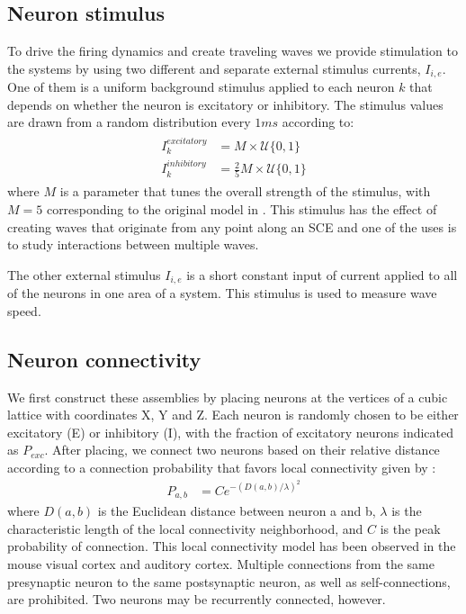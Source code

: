 \documentclass[12pt]{article}
\begin{document}
\subsection{Neuron stimulus}
To drive the firing dynamics and create traveling waves we provide stimulation to the systems by using two different and separate external stimulus currents, $I_{i,e}$. 
One of them is a uniform background stimulus applied to each neuron $k$ that depends on whether the neuron is excitatory or inhibitory.
The stimulus values are drawn from a random distribution every $1 ms$ according to:
\begin{align}\label{eq:randomstim}
 \begin{split}
  I_k^{excitatory} &= M \times \mathcal{U}\{0,1 \} \\
  I_k^{inhibitory} &= \frac{2}{5} M \times \mathcal{U}\{0,1 \}
 \end{split}
\end{align}
where $M$ is a parameter that tunes the overall strength of the stimulus, with $M=5$ corresponding to the original model in \parencite{izhikevich2003}. 
This stimulus has the effect of creating waves that originate from any point along an SCE and one of the uses is to study interactions between multiple waves.

The other external stimulus $I_{i,e}$ is a short constant input of current applied to all of the neurons in one area of a system.
This stimulus is used to measure wave speed.

\subsection{Neuron connectivity}
We first construct these assemblies by placing neurons at the vertices of a cubic lattice with coordinates X, Y and Z. 
Each neuron is  randomly chosen to be  either excitatory (E) or inhibitory (I), with the fraction of excitatory neurons indicated as $P_{exc}$.
After placing, we connect two neurons based on their relative distance according to a connection probability that favors local connectivity given by \parencite{maass2002}: 
\begin{align}\label{eq:connectivity}
 P_{a,b} &= C e^{-(D(a,b)/\lambda)^2}
\end{align}
where $D(a,b)$ is the Euclidean distance between neuron a and b, $\lambda$ is the characteristic length of the local connectivity neighborhood, and $C$ is the peak probability of connection.
This local connectivity model has been observed in the mouse visual cortex\parencite{Hellwig2000} and auditory cortex\parencite{Levy2012}.
Multiple connections from the same presynaptic neuron to the same postsynaptic neuron, as well as self-connections, are prohibited.
Two neurons may be recurrently connected, however. 
\end{document}
